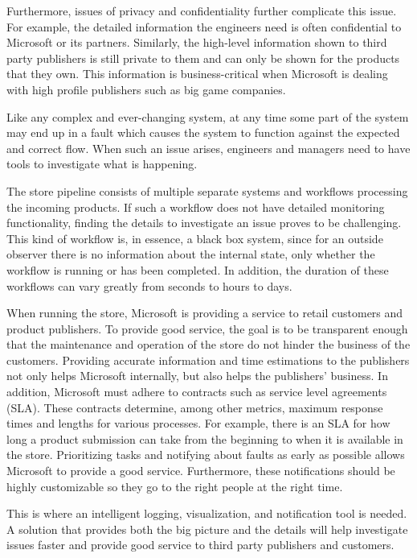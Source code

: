 Furthermore, issues of privacy and confidentiality further complicate this issue.
For example, the detailed information the engineers need is often confidential to Microsoft or its partners.
Similarly, the high-level information shown to third party publishers is still private to them 
and can only be shown for the products that they own.
This information is business-critical when Microsoft is dealing with high profile publishers such as big game companies.

Like any complex and ever-changing system, at any time some part of the system may end up in a fault
which causes the system to function against the expected and correct flow.
When such an issue arises, engineers and managers need to have tools to investigate what is happening. 

The store pipeline consists of multiple separate systems and workflows processing the incoming products.
If such a workflow does not have detailed monitoring functionality, 
finding the details to investigate an issue proves to be challenging.
This kind of workflow is, in essence, a black box system, since for an outside observer there is no information
about the internal state, only whether the workflow is running or has been completed.
In addition, the duration of these workflows can vary greatly from seconds to hours to days. 

When running the store, Microsoft is providing a service to retail customers and product publishers.
To provide good service, the goal is to be transparent enough that the maintenance and operation of the store do not hinder the business of the customers. 
Providing accurate information and time estimations to the publishers
not only helps Microsoft internally, but also helps the publishers' business.
In addition, Microsoft must adhere to contracts such as
service level agreements (SLA). These contracts determine, among other metrics, 
maximum response times and lengths for various processes.
For example, there is an SLA for how long a product submission can take from the beginning to when it is available in the store.
Prioritizing tasks and notifying about faults as early as possible allows Microsoft to provide a good service. 
Furthermore, these notifications should be highly customizable so they go to the right people at the right time.

This is where an intelligent logging, visualization, and notification tool is needed. 
A solution that provides both the big picture and the details will help investigate issues faster and
provide good service to third party publishers and customers.

